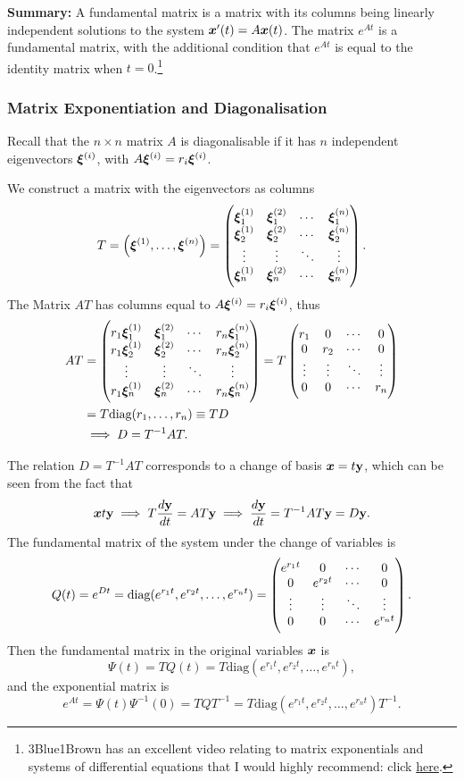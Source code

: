\textbf{Summary:} A fundamental matrix is a matrix with its columns being linearly independent solutions to the system $\bm{x}'(t) = A\bm{x}(t)$. The matrix $e^{At}$ is a fundamental matrix, with the additional condition that $e^{At}$ is equal to the identity matrix when $t=0$.\footnote{3Blue1Brown has an excellent video relating to matrix exponentials and systems of differential equations that I would highly recommend: click \href{https://www.youtube.com/watch?v=O85OWBJ2ayo}{here}.}

\subsubsection{Matrix Exponentiation and Diagonalisation}\label{sec:diag}

Recall that the $n \times n$ matrix $A$ is diagonalisable if it has $n$ independent eigenvectors $\bm{\xi}^{(i)}$, with $A \bm{\xi}^{(i)} = r_i \bm{\xi}^{(i)}$.

We construct a matrix with the eigenvectors as columns
\[
	T = \left(\bm{\xi} ^{(1)}, \ldots, \bm{\xi} ^{(n)}\right) = \begin{pmatrix}\bm{\xi}_1^{(1)} & \bm{\xi}_1^{(2)} & \cdots & \bm{\xi}_1^{(n)} \\ \bm{\xi}_2^{(1)} & \bm{\xi}_2^{(2)} & \cdots & \bm{\xi}_2^{(n)} \\ \vdots & \vdots & \ddots & \vdots \\ \bm{\xi}_n^{(1)} & \bm{\xi}_n^{(2)} & \cdots & \bm{\xi}_n^{(n)}\end{pmatrix}.
\]
The Matrix $AT$ has columns equal to $A \bm{\xi}^{(i)} = r_i \bm{\xi}^{(i)}$, thus
\begin{align*}
	AT &= \begin{pmatrix}r_1\bm{\xi}_1^{(1)} & \bm{\xi}_1^{(2)} & \cdots & r_n\bm{\xi}_1^{(n)} \\ r_1\bm{\xi}_2^{(1)} & \bm{\xi}_2^{(2)} & \cdots & r_n\bm{\xi}_2^{(n)} \\ \vdots & \vdots & \ddots & \vdots \\ r_1\bm{\xi}_n^{(1)} & \bm{\xi}_n^{(2)} & \cdots & r_n\bm{\xi}_n^{(n)}\end{pmatrix} = T \begin{pmatrix}r_1 & 0 & \cdots & 0 \\ 0 & r_2 & \cdots & 0 \\ \vdots & \vdots & \ddots & \vdots \\ 0 & 0 & \cdots & r_n\end{pmatrix} \\
	&= T \text{diag}(r_1, \ldots, r_n) \equiv TD \\
	&\implies D = T^{-1}AT.
\end{align*}

The relation $D = T^{-1}AT$ corresponds to a change of basis $\bm{x} = t\textbf{y}$, which can be seen from the fact that
\[
	\bm{x} t\textbf{y} \implies T \frac{d\textbf{y}}{dt} = AT\textbf{y} \implies \frac{d\textbf{y}}{dt} = T^{-1}AT \textbf{y} = D\textbf{y}.
\]
The fundamental matrix of the system under the change of variables is
\[
	Q(t) = e^{Dt} = \text{diag}(e^{r_1t}, e^{r_2t}, \ldots, e^{r_nt}) = \begin{pmatrix}e^{r_1t} & 0 & \cdots & 0 \\ 0 & e^{r_2t} & \cdots & 0 \\ \vdots & \vdots & \ddots & \vdots \\ 0 & 0 & \cdots & e^{r_nt}\end{pmatrix}.
\]
Then the fundamental matrix in the original variables $\bm{x}$ is
\[
	\Psi(t) = TQ(t) = T \text{diag}(e^{r_1t}, e^{r_2t}, \ldots, e^{r_nt}),
\]
and the exponential matrix is
\[
	e^{At} = \Psi(t) \Psi^{-1}(0) = TQT^{-1} = T \text{diag}(e^{r_1t}, e^{r_2t}, \ldots, e^{r_nt}) T^{-1}.
\]


